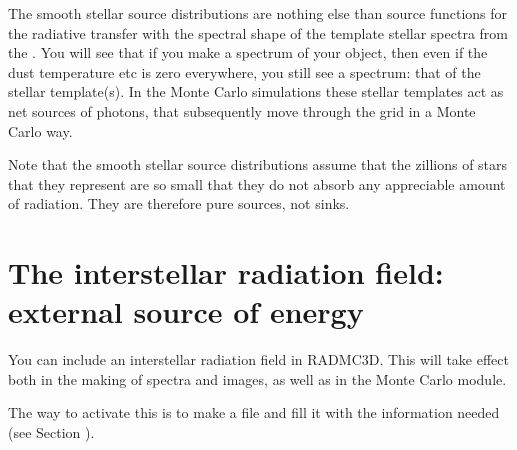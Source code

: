 \documentclass[letterpaper,10pt,english]{sphinxmanual}
\begin{document}
The smooth stellar source distributions are nothing else than source
functions for the radiative transfer with the spectral shape of the template
stellar spectra from the .  You will
see that if you make a spectrum of your object, then even if the dust
temperature etc is zero everywhere, you still see a spectrum: that of the
stellar template(s). In the Monte Carlo simulations these stellar templates
act as net sources of photons, that subsequently move through the grid in a
Monte Carlo way.

Note that the smooth stellar source distributions assume that the zillions
of stars that they represent are so small that they do not absorb any
appreciable amount of radiation. They are therefore pure sources, not sinks.


\section{The interstellar radiation field: external source of energy}
\label{\detokenize{stars:the-interstellar-radiation-field-external-source-of-energy}}\label{\detokenize{stars:sec-external-source}}
You can include an  interstellar radiation field in
RADMC\sphinxhyphen{}3D. This will take effect both in the making of spectra and images, as
well as in the Monte Carlo module.

The way to activate this is to make a file 
and fill it with the information needed (see Section {\hyperref[\detokenize{inputoutputfiles:sec-ext-src-inp}]{}}).
\end{document}
